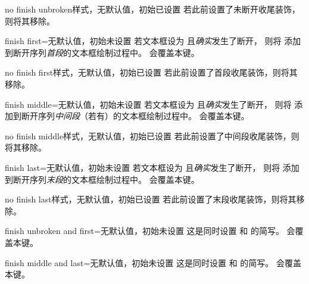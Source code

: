 \begin{docTcbKey}{no finish unbroken}{}{样式，无默认值，初始已设置}
  若此前设置了未断开收尾装饰，则将其移除。
\end{docTcbKey}

\begin{docTcbKey}{finish first}{=}{无默认值，初始未设置}
  若文本框设为  且\emph{确实}发生了断开，
  则将  添加到断开序列\emph{首段}的文本框绘制过程中。
   会覆盖本键。
\end{docTcbKey}

\begin{docTcbKey}{no finish first}{}{样式，无默认值，初始已设置}
  若此前设置了首段收尾装饰，则将其移除。
\end{docTcbKey}

\begin{docTcbKey}{finish middle}{=}{无默认值，初始未设置}
  若文本框设为  且\emph{确实}发生了断开，
  则将  添加到断开序列\emph{中间段}（若有）的文本框绘制过程中。
   会覆盖本键。
\end{docTcbKey}

\begin{docTcbKey}{no finish middle}{}{样式，无默认值，初始已设置}
  若此前设置了中间段收尾装饰，则将其移除。
\end{docTcbKey}

\begin{docTcbKey}{finish last}{=}{无默认值，初始未设置}
  若文本框设为  且\emph{确实}发生了断开，
  则将  添加到断开序列\emph{末段}的文本框绘制过程中。
   会覆盖本键。
\end{docTcbKey}

\begin{docTcbKey}{no finish last}{}{样式，无默认值，初始已设置}
  若此前设置了末段收尾装饰，则将其移除。
\end{docTcbKey}

\begin{docTcbKey}{finish unbroken and first}{=}{无默认值，初始未设置}
  这是同时设置
   和
   的简写。
   会覆盖本键。
\end{docTcbKey}

\begin{docTcbKey}{finish middle and last}{=}{无默认值，初始未设置}
  这是同时设置
   和
   的简写。
   会覆盖本键。
\end{docTcbKey}

